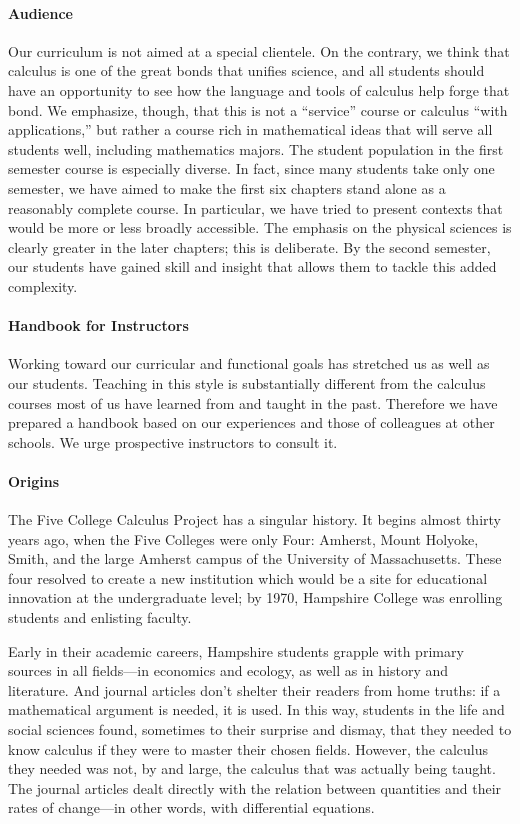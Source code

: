 \paragraph{Audience}  
Our curriculum is not aimed at a special clientele.  On the contrary,
we think that calculus is one of the great bonds that unifies science,
and all students should have an opportunity to see how the language
and tools of calculus help forge that bond.  We emphasize, though,
that this is not a ``service'' course or calculus ``with
applications,'' but rather a course rich in mathematical ideas that
will serve all students well, including mathematics majors.  The
student population in the first semester course is especially diverse.
In fact, since many students take only one semester, we have aimed to
make the first six chapters stand alone as a reasonably complete
course.  In particular, we have tried to present contexts that would
be more or less broadly accessible.  The emphasis on the physical
sciences is clearly greater in the later chapters; this is deliberate.
By the second semester, our students have gained skill and insight
that allows them to tackle this added complexity.

\paragraph{Handbook for Instructors}  
Working toward our curricular and functional goals has stretched us as
well as our students.  Teaching in this style is substantially
different from the calculus courses most of us have learned from and
taught in the past.  Therefore we have prepared a handbook based on
our experiences and those of colleagues at other schools.  We urge
prospective instructors to consult it.

\paragraph{Origins}  
The Five College Calculus Project has a singular history.  It begins
almost thirty years ago, when the Five Colleges were only Four:
Amherst, Mount Holyoke, Smith, and the large Amherst campus of the
University of Massachusetts.  These four resolved to create a new
institution which would be a site for educational innovation at the
undergraduate level; by 1970, Hampshire College was enrolling students
and enlisting faculty.

Early in their academic careers, Hampshire students grapple with
primary sources in all fields---in economics and ecology, as well as
in history and literature.  And journal articles don't shelter their
readers from home truths: if a mathematical argument is needed, it is
used.  In this way, students in the life and social sciences found,
sometimes to their surprise and dismay, that they needed to know
calculus if they were to master their chosen fields.  However, the
calculus they needed was not, by and large, the calculus that was
actually being taught.  The journal articles dealt directly with the
relation between quantities and their rates of change---in other
words, with differential equations.

